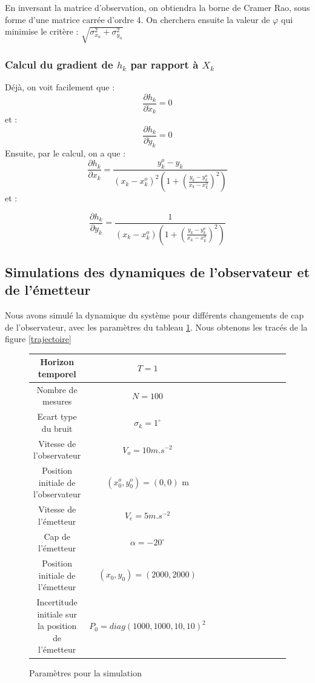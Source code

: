 \documentclass{article}
\begin{document}
En inversant la matrice d'observation, on obtiendra la borne de Cramer Rao, sous forme d'une matrice carrée d'ordre 4.
On cherchera ensuite la valeur de $\varphi$ qui minimise le critère : $\sqrt{\sigma_{x_{n}}^{2}+\sigma_{y_{n}}^{2}}$

\subsubsection{Calcul du gradient de $h_{k}$ par rapport à $X_{k}$}
Déjà, on voit facilement que : 
\[\frac{\partial h_{k}}{\partial \dot{x}_{k}} = 0 \] et :
\[\frac{\partial h_{k}}{\partial \dot{y}_{k}} = 0 \]
Ensuite, par le calcul, on a que : 
\[\frac{\partial h_{k}}{\partial x_{k}}=\frac{y_{k}^{o}-y_{k}}{\left(x_{k}-x_{k}^{o}\right)^{2}\left(1+\left(\frac{y_{k}-y_{k}^{o}}{x_{k}-x_{k}^{o}}\right)^{2}\right)}\]
et :

\[\frac{\partial h_{k}}{\partial y_{k}}= \frac{1}{\left(x_{k}-x_{k}^{o}\right)\left(1+\left( \frac{y_{k}-y_{k}^{o}}{x_{k}-x_{k}^{o}}  \right)^{2}\right)}\]
\subsection{Simulations des dynamiques de l'observateur et de l'émetteur}
Nous avons simulé la dynamique du système pour différents changements de cap de l'observateur, avec les paramètres du tableau \ref{paramètres}.
 Nous obtenons les tracés de la figure \ref{trajectoire}


\begin{figure}[h!]
  \centering
  \caption{Paramètres pour la simulation}
  \label{paramètres}
  \begin{tabular}{|*{11}{c|}}
    \hline Horizon temporel & $T = 1$ \\
    \hline Nombre de mesures  & $N=100$ \\
    \hline Ecart type du bruit & $\sigma_{k}=1^{\circ}$\\
    \hline Vitesse de l'observateur & $V_{o}=10 m.s^{-2}$\\
    \hline Position initiale de l'observateur &  $(x_{0}^{o},y_{0}^{o})=(0,0)$ m\\
    \hline Vitesse de l'émetteur & $V_{e} = 5 m.s^{-2}$\\
    \hline Cap de l'émetteur & $\alpha =-20^{\circ}$\\
    \hline Position initiale de l'émetteur & $(x_{0},y_{0})=(2000,2000)$\\
    \hline Incertitude initiale sur la position de l'émetteur & $P_{0}=diag(1000,1000,10,10)^{2}$\\
    \hline
  \end{tabular}
\end{figure}
\end{document}
